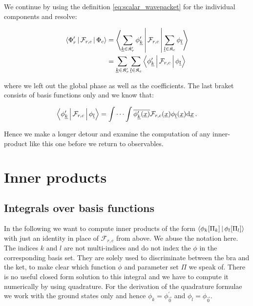 We continue by using the definition \eqref{eq:scalar_wavepacket} for the
individual components and resolve:

\begin{align*}
  \Braket{\Phi^\prime_r | \mathcal{F}_{r,c} | \Phi_c} & =
  \Braket{\sum_{\vec{k}\in\mathfrak{K}^\prime_r} \phi^\prime_{\vec{k}}
          | \mathcal{F}_{r,c} |
          \sum_{\vec{l}\in\mathfrak{K}_c} \phi_{\vec{l}}} \\
  & =
  \sum_{\vec{k}\in\mathfrak{K}^\prime_r}
  \sum_{\vec{l}\in\mathfrak{K}_c}
  \Braket{\phi^\prime_{\vec{k}} | \mathcal{F}_{r,c} | \phi_{\vec{l}}}
\end{align*}

where we left out the global phase as well as the coefficients. The last
braket consists of basis functions only and we know that:

\begin{equation*}
  \Braket{\phi^\prime_{\vec{k}} | \mathcal{F}_{r,c} | \phi_{\vec{l}}}
  =
  \idotsint \conj{\phi^\prime_{\vec{k}}(\vec{x})} \mathcal{F}_{r,c}(\vec{x}) \phi_{\vec{l}}(\vec{x}) \mathrm{d}\vec{x} \,.
\end{equation*}

Hence we make a longer detour and examine the computation of any
inner-product like this one before we return to observables.


\section{Inner products}


\subsection{Integrals over basis functions}


In the following we want to compute inner products of the form
$\Braket{\phi_k[\Pi_k]|\phi_l[\Pi_l]}$ with just an identity
in place of $\mathcal{F}_{r,c}$ from above. We abuse the notation
here. The indices $k$ and $l$ are not multi-indices and do not index
the $\phi$ in the corresponding basis set. They are solely used to
discriminate between the bra and the ket, to make clear which
function $\phi$ and parameter set $\Pi$ we speak of. There is no useful
closed form solution to this integral and we have to compute it
numerically by using quadrature. For the derivation of the quadrature
formulae we work with the ground states only and hence $\phi_k = \phi^\prime_{\vec{0}}$
and $\phi_l = \phi_{\vec{0}}$.


